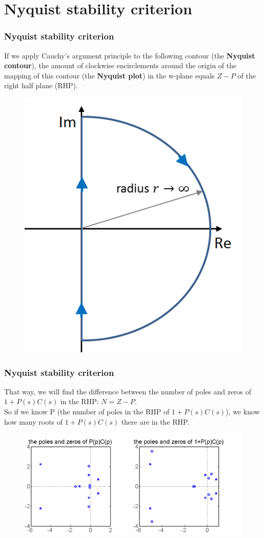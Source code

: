 \section{Nyquist stability criterion}

\begin{frame}
	\frametitle{Nyquist stability criterion}
	If we apply Cauchy's argument principle to the following contour (the \textbf{Nyquist contour}), the amount of clockwise encirclements around the origin of the mapping of this contour (the \textbf{Nyquist plot}) in the w-plane equals $Z-P$ of the right half plane (RHP).
	\vspace{-1ex}
	\begin{figure}
		\includegraphics[width=0.35\linewidth]{nyquist_plot}
	\end{figure}
\end{frame}

\begin{frame}
	\frametitle{Nyquist stability criterion}
	That way, we will find the difference between the number of poles and zeros of $1+P(s)C(s)$ in the RHP: $N=Z-P$.\\
	\medskip
	So if we know P (the number of poles in the RHP of $1+P(s)C(s)$), we know how many roots of $1+P(s)C(s)$ there are in the RHP.
	\begin{figure}
		\includegraphics[width=0.8\linewidth]{pz}
	\end{figure}
\end{frame}

